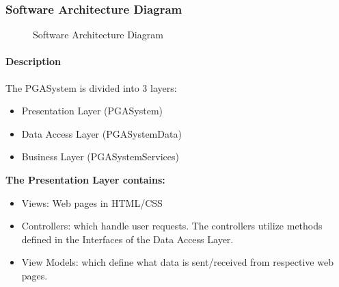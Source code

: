 \documentclass[11pt]{article}
\begin{document}
\subsubsection{Software Architecture Diagram}
\begin{figure}[H]
	\caption{Software Architecture Diagram}
\end{figure}
\paragraph{Description}
The PGASystem is divided into 3 layers:
\begin{itemize}
	\item Presentation Layer (PGASystem)
	\item Data Access Layer (PGASystemData) 
	\item Business Layer (PGASystemServices)
\end{itemize}
\textbf{The Presentation Layer contains:}
\begin{itemize}
\item Views: Web pages in HTML/CSS
\item Controllers: which handle user requests. The controllers utilize methods defined in the Interfaces of the Data Access Layer.
\item View Models: which define what data is sent/received from respective web pages. 
\end{itemize}
\end{document}
